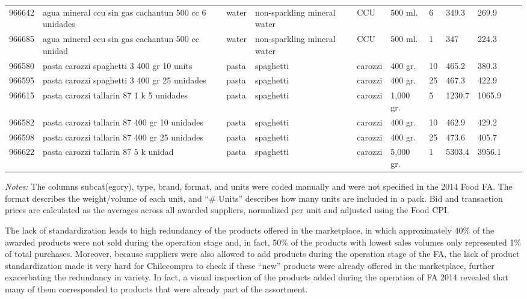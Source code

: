 \begin{table}[H]
{{\begin{tabular}{lllllllllll}
    966642  & agua mineral ccu sin gas cachantun 500 cc 6 unidades & water  & non-sparkling mineral water & CCU         & 500 ml.   & 6      & 349.3     & 269.9             \\
    966685  & agua mineral ccu sin gas cachantun 500 cc unidad     & water  & non-sparkling mineral water & CCU         & 500 ml.   & 1      & 347       & 224.3             \\
    \midrule 
    966580  & pasta carozzi spaghetti 3 400 gr 10 units            & pasta  & spaghetti                   & carozzi     & 400 gr.   & 10     & 465.2     & 380.3             \\
    966595  & pasta carozzi spaghetti 3 400 gr 25 unidades         & pasta  & spaghetti                   & carozzi     & 400 gr.   & 25     & 467.3     & 422.9             \\
    966615  & pasta carozzi tallarin 87 1 k 5 unidades             & pasta  & spaghetti                   & carozzi     & 1,000 gr. & 5      & 1230.7    & 1065.9            \\
    966582  & pasta carozzi tallarin 87 400 gr 10 unidades         & pasta  & spaghetti                   & carozzi     & 400 gr.   & 10     & 462.9     & 429.2             \\
    966598  & pasta carozzi tallarin 87 400 gr 25 unidades         & pasta  & spaghetti                   & carozzi     & 400 gr.   & 25     & 473.6     & 405.7             \\
    966622  & pasta carozzi tallarin 87 5 k unidad                 & pasta  & spaghetti                   & carozzi     & 5,000 gr. & 1      & 5303.4    & 3956.1  \\ 
    \bottomrule
    \end{tabular} }

}
    \small{ \textit{Notes:} The columns subcat(egory), type, brand, format, and units were coded manually and were not specified in the 2014 Food FA. The format describes the weight/volume of each unit, and ``\# Units'' describes how many units are included in a pack. Bid and transaction prices are calculated as the averages across all awarded suppliers, normalized per unit and adjusted using the Food CPI.}
    \label{tab:FA2014_cat_wPrice}
\end{table}


The lack of standardization leads to high redundancy of the products offered in the marketplace, in which approximately 40\% of the awarded products were not sold during the operation stage and, in fact, 50\% of the products with lowest sales volumes only represented 1\% of total purchases.  Moreover, because suppliers were also allowed to add products during the operation stage of the FA, the lack of product standardization made it very hard for Chilecompra to check if these ``new'' products were already offered in the marketplace, further exacerbating the redundancy in variety. In fact, a visual inspection of the products added during the operation of FA 2014  revealed that many of them corresponded to products that were already  part of the assortment.

